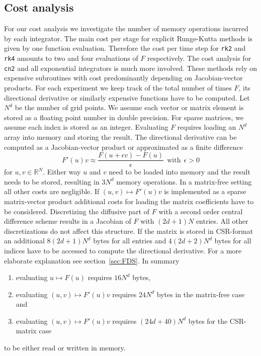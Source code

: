 \documentclass{scrartcl}
\begin{document}
	\subsection{Cost analysis}
	For our cost analysis we investigate the number of memory operations incurred by each integrator. The main cost per stage for explicit Runge-Kutta methods is given by one function evaluation. Therefore the cost per time step for \texttt{rk2} and \texttt{rk4} amounts to two and four evaluations of $F$ respectively. The cost analysis for \texttt{cn2} and all exponential integrators is much more involved. These methods rely on expensive subroutines with cost predominantly depending on Jacobian-vector products. For each experiment we keep track of the total number of times $F$, its directional derivative or similarly expensive functions have to be computed.
	Let $N^d$ be the number of grid points. We assume each vector or matrix element is stored as a floating point number in double precision. For sparse matrices, we assume each index is stored as an integer. Evaluating $F$ requires loading an $N^d$ array into memory and storing the result. The directional derivative can be computed as a Jacobian-vector product or approximated as a finite difference 
	\[
	F'(u)v \approx \frac{F(u+\epsilon v)-F(u)}{\epsilon} ~~\text{with}~~ \epsilon > 0
	\]
	for $u, v\in\mathbb{R}^{N}$.
	Either way $u$ and $v$ need to be loaded into memory and the result needs to be stored, resulting in $3N^d$ memory operations. In a matrix-free setting all other costs are negligible. If $(u,v)\mapsto F'(u)v$ is implemented as a sparse matrix-vector product additional costs for loading the matrix coefficients have to be considered. Discretizing the diffusive part of $F$ with a second order central difference scheme results in a Jacobian of $F$ with $(2d+1)N$ entries. All other discretizations do not affect this structure. If the matrix is stored in CSR-format an additional $8(2d+1)N^d$ bytes for all entries and $4(2d+2)N^d$ bytes for all indices have to be accessed to compute the directional derivative. For a more elaborate explanation see section~\ref{sec:FDS}.
	In summary
	\begin{enumerate}
		\item evaluating $u \mapsto F(u)$ requires $16N^d$ bytes,
		\item evaluating $(u,v) \mapsto F'(u)v$ requires $24N^d$ bytes in the matrix-free case and
		\item evaluating $(u,v) \mapsto F'(u)v$ requires $(24d+40)N^d$ bytes for the CSR-matrix case
	\end{enumerate}
	to be either read or written in memory. 
	
\end{document}
